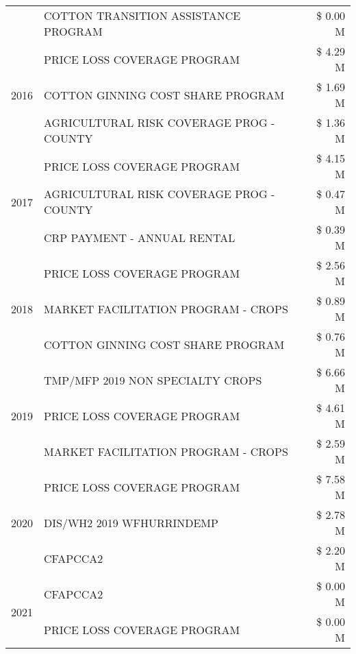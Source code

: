 \begin{tabular}{llr}
 & COTTON TRANSITION ASSISTANCE PROGRAM & \$ 0.00 M \\
\cline{1-3}
\multirow[t]{3}{*}{2016} & PRICE LOSS COVERAGE PROGRAM & \$ 4.29 M \\
 & COTTON GINNING COST SHARE PROGRAM & \$ 1.69 M \\
 & AGRICULTURAL RISK COVERAGE PROG - COUNTY & \$ 1.36 M \\
\cline{1-3}
\multirow[t]{3}{*}{2017} & PRICE LOSS COVERAGE PROGRAM & \$ 4.15 M \\
 & AGRICULTURAL RISK COVERAGE PROG - COUNTY & \$ 0.47 M \\
 & CRP PAYMENT - ANNUAL RENTAL & \$ 0.39 M \\
\cline{1-3}
\multirow[t]{3}{*}{2018} & PRICE LOSS COVERAGE PROGRAM & \$ 2.56 M \\
 & MARKET FACILITATION PROGRAM - CROPS & \$ 0.89 M \\
 & COTTON GINNING COST SHARE PROGRAM & \$ 0.76 M \\
\cline{1-3}
\multirow[t]{3}{*}{2019} & TMP/MFP 2019 NON SPECIALTY CROPS & \$ 6.66 M \\
 & PRICE LOSS COVERAGE PROGRAM & \$ 4.61 M \\
 & MARKET FACILITATION PROGRAM - CROPS & \$ 2.59 M \\
\cline{1-3}
\multirow[t]{3}{*}{2020} & PRICE LOSS COVERAGE PROGRAM & \$ 7.58 M \\
 & DIS/WH2 2019 WFHURRINDEMP & \$ 2.78 M \\
 & CFAPCCA2 & \$ 2.20 M \\
\cline{1-3}
\multirow[t]{2}{*}{2021} & CFAPCCA2 & \$ 0.00 M \\
 & PRICE LOSS COVERAGE PROGRAM & \$ 0.00 M \\
\cline{1-3}
\bottomrule
\end{tabular}
